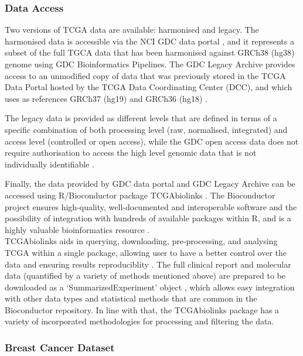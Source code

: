     \subsubsection{Data Access}

    Two versions of TCGA data are available: harmonised and legacy. The harmonised data is accessible via the NCI GDC data portal \cite{NCICommons}, and it represents a subset of the full TGCA data that has been harmonised against GRCh38 (hg38) genome using GDC Bioinformatics Pipelines. The GDC Legacy Archive provides access to an unmodified copy of data that was previously stored in the TCGA Data Portal hosted by the TCGA Data Coordinating Center (DCC), and  which uses as references GRCh37 (hg19) and GRCh36 (hg18) \cite{Silva2016TCGAPackages}.

    The legacy data is provided as different levels that are defined in terms of a specific combination of both processing level (raw, normalised, integrated) and access level (controlled or open access), while the GDC open access data does not require authorisation to access the high level genomic data that is not individually identifiable \cite{NCICommons, Silva2016TCGAPackages}.
    
    Finally, the data provided by GDC data portal and GDC Legacy Archive can be accessed using R/Bioconductor package TCGAbiolinks \cite{Colaprico2016}. The Bioconductor project ensures high-quality, well-documented and interoperable software and the possibility of integration with hundreds of available packages within R, and is a highly valuable bioinformatics resource \cite{gentleman2004bioconductor}. \\TCGAbiolinks aids in querying, downloading, pre-processing, and analysing TCGA within a single package, allowing user to have a better control over the data and ensuring results reproduciblity \cite{Colaprico2016}. The full clinical report and molecular data (quantified by a variety of methods mentioned above) are prepared to be downloaded as a ‘SummarizedExperiment’ object \cite{Huber2015OrchestratingBioconductor}, which allows easy integration with other data types and statistical methods that are common in the Bioconductor repository.  In line with that, the TCGAbiolinks package has a variety of incorporated methodologies for processing and filtering the data.  
    
    \newpage
    \subsubsection{Breast Cancer Dataset}
    
